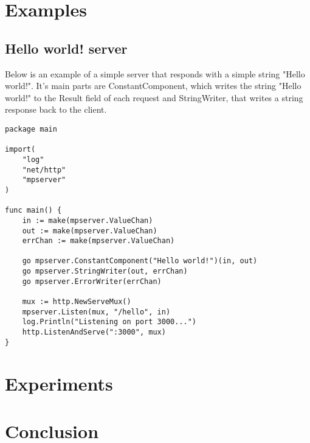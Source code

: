 \documentclass[12pt,a4paper]{article}
\begin{document}
\newpage
\section{Examples}
\subsection{Hello world! server}
Below is an example of a simple server that responds with a
simple string "Hello world!". It's main parts are ConstantComponent,
which writes the string "Hello world!" to the Result field of each request and 
StringWriter, that writes a string response back to the client. 

\begin{lstlisting}
package main

import(
    "log"
    "net/http"
    "mpserver"
)

func main() {
    in := make(mpserver.ValueChan)
    out := make(mpserver.ValueChan)
    errChan := make(mpserver.ValueChan)

    go mpserver.ConstantComponent("Hello world!")(in, out)
    go mpserver.StringWriter(out, errChan)
    go mpserver.ErrorWriter(errChan)

    mux := http.NewServeMux()
    mpserver.Listen(mux, "/hello", in)
    log.Println("Listening on port 3000...")
    http.ListenAndServe(":3000", mux)
}
\end{lstlisting}

\section{Experiments}
\section{Conclusion}
\end{document}
